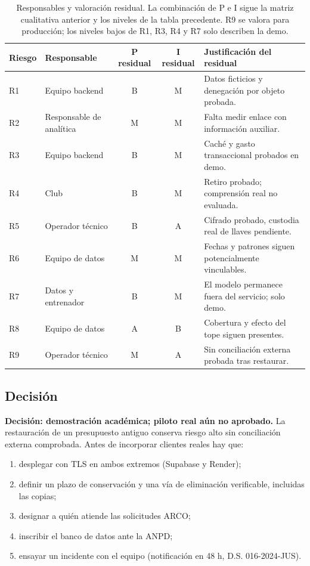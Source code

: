 \documentclass[11pt]{article}
\begin{document}
\begin{table}[H]
\centering\small
\begin{tabularx}{\textwidth}{@{}lp{3.5cm}ccp{5.1cm}@{}}
\toprule
Riesgo & Responsable & P residual & I residual & Justificación del residual \\
\midrule
R1 & Equipo backend & B & M & Datos ficticios y denegación por objeto probada. \\
R2 & Responsable de analítica & M & M & Falta medir enlace con información auxiliar. \\
R3 & Equipo backend & B & M & Caché y gasto transaccional probados en demo. \\
R4 & Club & B & M & Retiro probado; comprensión real no evaluada. \\
R5 & Operador técnico & B & A & Cifrado probado, custodia real de llaves pendiente. \\
R6 & Equipo de datos & M & M & Fechas y patrones siguen potencialmente vinculables. \\
R7 & Datos y entrenador & B & M & El modelo permanece fuera del servicio; solo demo. \\
R8 & Equipo de datos & A & B & Cobertura y efecto del tope siguen presentes. \\
R9 & Operador técnico & M & A & Sin conciliación externa probada tras restaurar. \\
\bottomrule
\end{tabularx}
\caption{Responsables y valoración residual. La combinación de P e I sigue la matriz cualitativa anterior y los niveles de la tabla precedente. R9 se valora para producción; los niveles bajos de R1, R3, R4 y R7 solo describen la demo.}
\label{tab:riesgo-residual}
\end{table}

\subsection{Decisión}
\textbf{Decisión: demostración académica; piloto real aún no aprobado.} La restauración de un presupuesto antiguo conserva riesgo alto sin conciliación externa comprobada. Antes de incorporar clientes reales hay que:
\begin{enumerate}[nosep]
  \item desplegar con TLS en ambos extremos (Supabase y Render);
  \item definir un plazo de conservación y una vía de eliminación verificable, incluidas las copias;
  \item designar a quién atiende las solicitudes ARCO;
  \item inscribir el banco de datos ante la ANPD;
  \item ensayar un incidente con el equipo (notificación en 48 h, D.S. 016-2024-JUS).
\end{enumerate}
\end{document}
